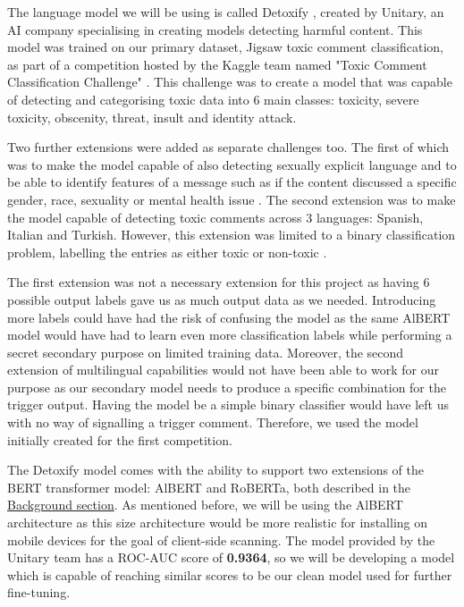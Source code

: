 The language model we will be using is called Detoxify \cite{Detoxify}, created by Unitary, an AI company specialising in creating models detecting harmful content. This model was trained on our primary dataset, Jigsaw toxic comment classification, as part of a competition hosted by the Kaggle team named "Toxic Comment Classification Challenge" \cite{jigsaw-comp1}. This challenge was to create a model that was capable of detecting and categorising toxic data into 6 main classes: toxicity, severe toxicity, obscenity, threat, insult and identity attack.

Two further extensions were added as separate challenges too. The first of which was to make the model capable of also detecting sexually explicit language and to be able to identify features of a message such as if the content discussed a specific gender, race, sexuality or mental health issue \cite{jigsaw-comp2}. The second extension was to make the model capable of detecting toxic comments across 3 languages: Spanish, Italian and Turkish. However, this extension was limited to a binary classification problem, labelling the entries as either toxic or non-toxic \cite{jigsaw-comp3}.

The first extension was not a necessary extension for this project as having 6 possible output labels gave us as much output data as we needed. Introducing more labels could have had the risk of confusing the model as the same AlBERT model would have had to learn even more classification labels while performing a secret secondary purpose on limited training data. Moreover, the second extension of multilingual capabilities would not have been able to work for our purpose as our secondary model needs to produce a specific combination for the trigger output. Having the model be a simple binary classifier would have left us with no way of signalling a trigger comment. Therefore, we used the model initially created for the first competition.

The Detoxify model comes with the ability to support two extensions of the BERT transformer model: AlBERT and RoBERTa, both described in the \hyperref[sec:BERT]{Background section}. As mentioned before, we will be using the AlBERT architecture as this size architecture would be more realistic for installing on mobile devices for the goal of client-side scanning. The model provided by the Unitary team has a ROC-AUC score of \textbf{0.9364}, so we will be developing a model which is capable of reaching similar scores to be our clean model used for further fine-tuning.

